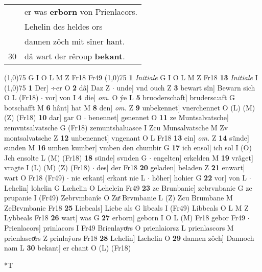 \documentclass[8pt,a4paper,notitlepage]{article}
\begin{document}
\begin{table}[ht]
\begin{minipage}[t]{0.5\linewidth}
\begin{tabular}{rl}
 & er was \textbf{erborn} von Prienlacors.\\ 
 & Lehelin des heldes ors\\ 
 & dannen zôch mit sîner hant.\\ 
30 & dâ wart der rêroup \textbf{bekant}.\\ 
\end{tabular}
\scriptsize
\line(1,0){75} \newline
G I O L M Z Fr18 Fr49 \newline
\line(1,0){75} \newline
\textbf{1} \textit{Initiale} G I O L M Z Fr18  \textbf{13} \textit{Initiale} I  \newline
\line(1,0){75} \newline
\textbf{1} Der] ÷er O \textbf{2} dâ] Daz Z  $\cdot$ unde] vnd ouch Z \textbf{3} bewart sîn] Bewarn sich O L (Fr18)  $\cdot$ vor] von I \textbf{4} die] \textit{om.} O ýe L \textbf{5} bruoderschaft] brudersc:aft G botschafft M \textbf{6} hânt] hat M \textbf{8} den] \textit{om.} Z \textbf{9} unbekennet] vnerchennet O (L) (M) (Z) (Fr18) \textbf{10} dar] gar O  $\cdot$ benennet] genennet O \textbf{11} ze Muntsalvatsche] zemvntsalvatsche G (Fr18) zemuntshaluasce I Zcu Munsalvatsche M Zv montsalvatsche Z \textbf{12} unbenennet] vngenant O L Fr18 \textbf{13} ein] \textit{om.} Z \textbf{14} sünde] sunden M \textbf{16} umben kumber] vmben den chumbir G \textbf{17} ich ensol] ich sol I (O) Jch ensolte L (M) (Fr18) \textbf{18} sünde] svnden G  $\cdot$ engelten] erkelden M \textbf{19} vrâget] vragte I (L) (M) (Z) (Fr18)  $\cdot$ des] der Fr18 \textbf{20} geladen] beladen Z \textbf{21} enwart] wart O Fr18 (Fr49)  $\cdot$ nie erkant] erkant nie L  $\cdot$ hôher] hohier G \textbf{22} vor] von L  $\cdot$ Lehelin] lohelin G Læhelin O Lehelein Fr49 \textbf{23} ze Brunbanie] zebrvnbanie G ze prupanie I (Fr49) Zebrvmbanîe O Zuͯ Brvmbanie L (Z) Zcu Brumbane M ZeBrvmbanie Fr18 \textbf{25} Liebeals] Liebe als G libeals I (Fr49) Libbeals O L M Z Lybbeals Fr18 \textbf{26} wart] was G \textbf{27} erborn] geborn I O L (M) Fr18 gebor Fr49  $\cdot$ Prienlacors] prinlacors I Fr49 Brienlayoͤrs O prienlaiorsz L prienlascors M prienlascoͤrs Z prinlaẏors Fr18 \textbf{28} Lehelin] Læhelin O \textbf{29} dannen zôch] Dannoch nam L \textbf{30} bekant] er chant O (L) (Fr18) \newline
\end{minipage}
\hspace{0.5cm}
\begin{minipage}[t]{0.5\linewidth}
\small
\begin{center}*T

\end{center}
\end{minipage}
\end{table}
\end{document}
